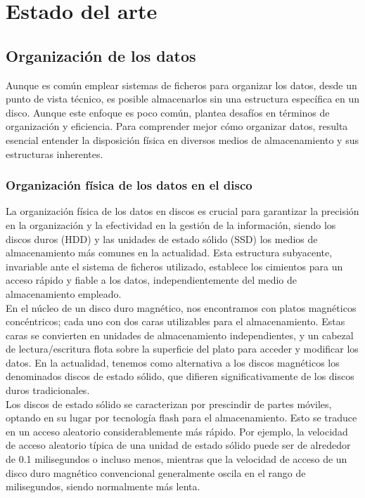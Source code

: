 \chapter{Estado del arte} \label{sec:capítulo_2}

\section{Organización de los datos}

Aunque es común emplear sistemas de ficheros para organizar los datos, desde un punto de vista técnico, es posible almacenarlos sin una estructura específica en un disco. Aunque este enfoque es poco común, plantea desafíos en términos de organización y eficiencia. Para comprender mejor cómo organizar datos, resulta esencial entender la disposición física en diversos medios de almacenamiento y sus estructuras inherentes.

\subsection{Organización física de los datos en el disco}

La organización física de los datos en discos es crucial para garantizar la precisión en la organización y la efectividad en la gestión de la información, siendo los discos duros (HDD) y las unidades de estado sólido (SSD) los medios de almacenamiento más comunes en la actualidad. Esta estructura subyacente, invariable ante el sistema de ficheros utilizado, establece los cimientos para un acceso rápido y fiable a los datos, independientemente del medio de almacenamiento empleado.\\

En el núcleo de un disco duro magnético, nos encontramos con platos magnéticos concéntricos; cada uno con dos caras utilizables para el almacenamiento. Estas caras se convierten en unidades de almacenamiento independientes, y un cabezal de lectura/escritura flota sobre la superficie del plato para acceder y modificar los datos. En la actualidad, tenemos como alternativa a los discos magnéticos los denominados discos de estado sólido, que difieren significativamente de los discos duros tradicionales\cite{Hdd}.\\
 
Los discos de estado sólido se caracterizan por prescindir de partes móviles, optando en su lugar por tecnología flash para el almacenamiento. Esto se traduce en un acceso aleatorio considerablemente más rápido. Por ejemplo, la velocidad de acceso aleatorio típica de una unidad de estado sólido puede ser de alrededor de 0.1 milisegundos o incluso menos, mientras que la velocidad de acceso de un disco duro magnético convencional generalmente oscila en el rango de milisegundos, siendo normalmente más lenta.\\ 

